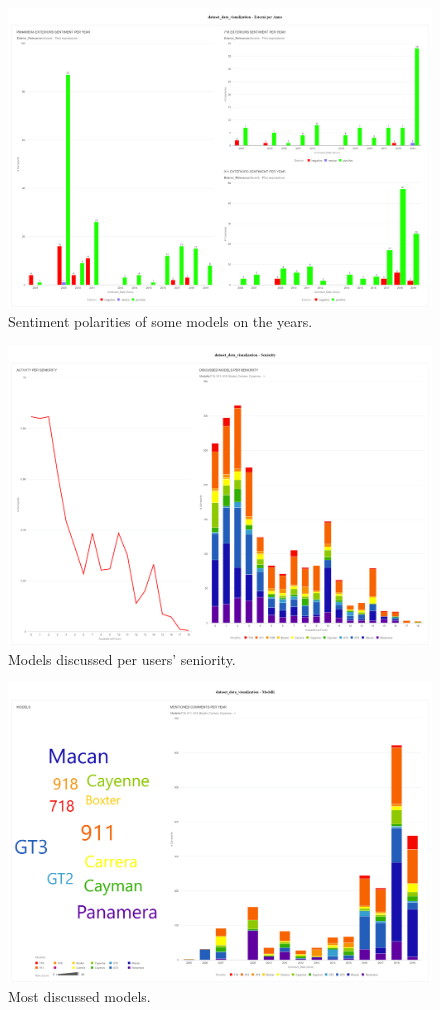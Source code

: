\begin{figure}[ht]
	\centering
	\includegraphics[width=\textwidth]{figures/odv_export/dataset_data_visualization_5.pdf}
	\caption{Sentiment polarities of some models on the years.}
	\label{fig:ext-year-snt}
\end{figure}


\begin{figure}[ht]
	\centering
	\includegraphics[width=\textwidth]{figures/odv_export/dataset_data_visualization_9.pdf}
	\caption{Models discussed per users' seniority.}
	\label{fig:model-senior}
\end{figure}


\begin{figure}[ht]
	\centering
	\includegraphics[width=\textwidth]{figures/odv_export/dataset_data_visualization_13.pdf}
	\caption{Most discussed models.}
	\label{fig:models}
\end{figure}